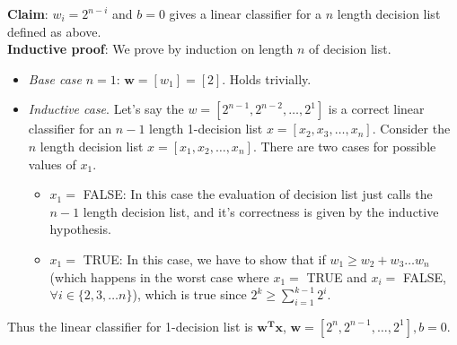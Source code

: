 \documentclass{article}
\begin{document}
\textbf{Claim}: $w_i = 2^{n-i}$ and $b = 0$ gives a linear classifier for a $n$ length decision list defined as above. \\

\textbf{Inductive proof}: We prove by induction on length $n$ of decision list.
\begin{itemize}
    \item \textit{Base case} $n = 1$: $\mathbf{w} = [w_1] = [2]$. Holds trivially.
    \item \textit{Inductive case}. Let's say the $w = [2^{n-1}, 2^{n-2}, \ldots, 2^1]$ is a correct linear classifier for an $n-1$ length 1-decision list  $x = [x_2, x_3, \ldots, x_n]$. Consider the $n$ length decision list $x = [x_1, x_2, \ldots, x_n]$. There are two cases for possible values of $x_1$.
    \begin{itemize}
        \item{$x_1 = $ \textsc{FALSE}}: In this case the evaluation of decision list just calls the $n-1$ length decision list, and it's correctness is given by the inductive hypothesis.
        \item{$x_1 = $ \textsc{TRUE}}: In this case, we have to show that if $w_1 \geq w_2 + w_3 \ldots w_n$ (which happens in the worst case where $x_1 = $ \textsc{TRUE} and $x_i = $ \textsc{FALSE}, $\forall i \in \{2, 3, \ldots n\}$), which is true since $2^k \geq \sum_{i=1}^{k-1}2^i$. 
    \end{itemize}
\end{itemize}
Thus the linear classifier for 1-decision list is $\mathbf{w^Tx}$, $\mathbf{w} = [2^{n}, 2^{n-1}, \ldots, 2^1], b = 0$.
\end{document}
